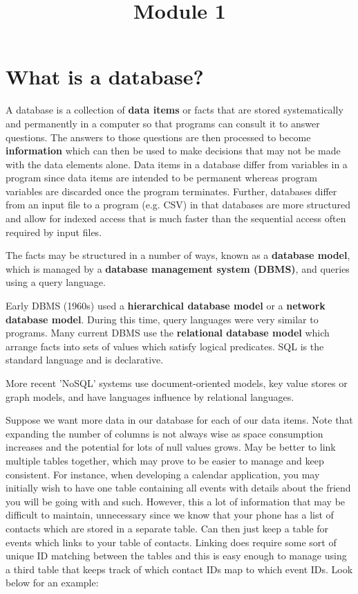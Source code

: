 \documentclass{article}
\title{Module 1}
\begin{document}
\section*{What is a database?}
A database is a collection of \textbf{data items} or facts that are stored systematically and permanently in a computer so that programs can consult it to answer questions. The answers to those questions are then processed to become \textbf{information} which can then be used to make decisions that may not be made with the data elements alone. Data items in a database differ from variables in a program since data items are intended to be permanent whereas program variables are discarded once the program terminates. Further, databases differ from an input file to a program (e.g. CSV) in that databases are more structured and allow for indexed access that is much faster than the sequential access often required by input files.

The facts may be structured in a number of ways, known as a \textbf{database model}, which is managed by a \textbf{database management system (DBMS)}, and queries using a query language.

Early DBMS (1960s) used a \textbf{hierarchical database model} or a \textbf{network database model}. During this time, query languages were very similar to programs. Many current DBMS use the \textbf{relational database model} which arrange facts into sets of values which satisfy logical predicates. SQL is the standard language and is declarative.

More recent 'NoSQL' systems use document-oriented models, key value stores or graph models, and have languages influence by relational languages.

Suppose we want more data in our database for each of our data items. Note that expanding the number of columns is not always wise as space consumption increases and the potential for lots of null values grows. May be better to link multiple tables together, which may prove to be easier to manage and keep consistent. For instance, when developing a calendar application, you may initially wish to have one table containing all events with details about the friend you will be going with and such. However, this a lot of information that may be difficult to maintain, unnecessary since we know that your phone has a list of contacts which are stored in a separate table. Can then just keep a table for events which links to your table of contacts. Linking does require some sort of unique ID matching between the tables and this is easy enough to manage using a third table that keeps track of which contact IDs map to which event IDs. Look below for an example: 
\end{document}
